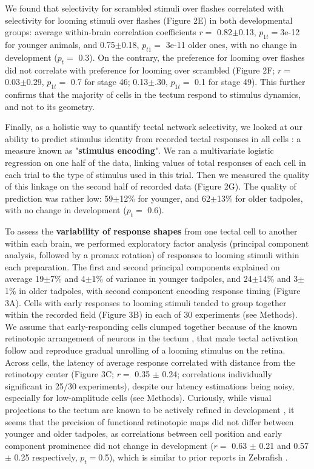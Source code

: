 \documentclass{article}
\begin{document}
We found that selectivity for scrambled stimuli over flashes correlated with selectivity for looming stimuli over flashes (Figure 2E) in both developmental groups: average within-brain correlation coefficients $r=$ 0.82$\pm$0.13, $p_{1t}=$3e-12 for younger animals, and 0.75$\pm$0.18, $p_{t1}=$ 3e-11 older ones, with no change in development ($p_t=$ 0.3). On the contrary, the preference for looming over flashes did not correlate with preference for looming over scrambled (Figure 2F; $r=$ 0.03$\pm$0.29, $p_{1t}=$ 0.7 for stage 46; 0.13$\pm$.30, $p_{1t}=$ 0.1 for stage 49). This further confirms that the majority of cells in the tectum respond to stimulus dynamics, and not to its geometry.

Finally, as a holistic way to quantify tectal network selectivity, we looked at our ability to predict stimulus identity from recorded tectal responses in all cells \citep{avitan2016limitations}: a measure known as "\textbf{stimulus encoding}". We ran a multivariate logistic regression on one half of the data, linking values of total responses of each cell in each trial to the type of stimulus used in this trial. Then we measured the quality of this linkage on the second half of recorded data (Figure 2G). The quality of prediction was rather low: 59$\pm$12\% for younger, and 62$\pm$13\% for older tadpoles, with no change in development ($p_t=$ 0.6).

To assess the \textbf{variability of response shapes} from one tectal cell to another within each brain, we performed exploratory factor analysis (principal component analysis, followed by a promax rotation) of responses to looming stimuli within each preparation. The first and second principal components explained on average 19$\pm$7\% and 4$\pm$1\% of variance in younger tadpoles, and 24$\pm$14\% and 3$\pm$1\% in older tadpoles, with second component encoding response timing (Figure 3A). Cells with early responses to looming stimuli tended to group together within the recorded field (Figure 3B) in each of 30 experiments (see Methods). We assume that early-responding cells clumped together because of the known retinotopic arrangement of neurons in the tectum \citep{ruthazer2004map}, that made tectal activation follow and reproduce gradual unrolling of a looming stimulus on the retina. Across cells, the latency of average response correlated with distance from the retinotopy center (Figure 3C; $r=$ 0.35 $\pm$ 0.24; correlations individually significant in 25/30 experiments), despite our latency estimations being noisy, especially for low-amplitude cells (see Methods). Curiously, while visual projections to the tectum are known to be actively refined in development \citep{sakaguchi1985refinement, ruthazer2004map, munz2014hebbian}, it seems that the precision of functional retinotopic maps did not differ between younger and older tadpoles, as correlations between cell position and early component prominence did not change in development ($r=$ 0.63 $\pm$ 0.21 and 0.57 $\pm$ 0.25 respectively, $p_t= $0.5), which is similar to prior reports in Zebrafish \citep{avitan2016limitations}.
\end{document}
